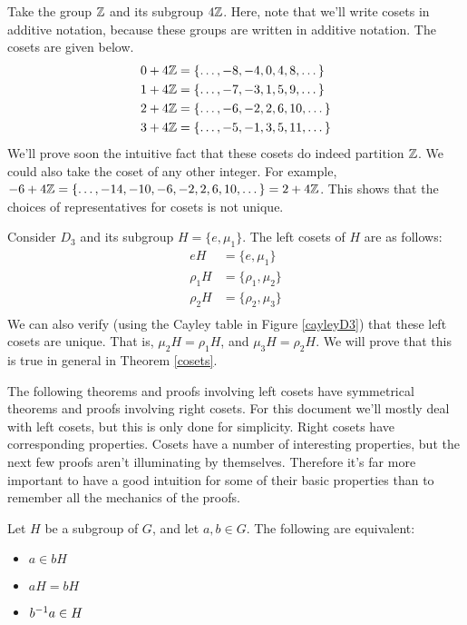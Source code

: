 \begin{example}
Take the group $\mathbb{Z}$ and its subgroup $4\mathbb{Z}$. Here, note that we'll write cosets in additive notation, because these groups are written in additive notation. The cosets are given below.
\begin{align*}
    0 + 4\mathbb{Z} &= \{\dots, -8, -4, 0, 4, 8, \dots\} \\
    1 + 4\mathbb{Z} &= \{\dots, -7, -3, 1, 5, 9, \dots\} \\
    2 + 4\mathbb{Z} &= \{\dots, -6, -2, 2, 6, 10, \dots\} \\
    3 + 4\mathbb{Z} &= \{\dots, -5, -1, 3, 5, 11, \dots\}
\end{align*}
We'll prove soon the intuitive fact that these cosets do indeed partition $\mathbb{Z}$. We could also take the coset of any other integer. For example, $-6 + 4\mathbb{Z} = \{\dots, -14, -10, -6, -2, 2, 6, 10, \dots\} = 2 + 4\mathbb{Z}$. This shows that the choices of representatives for cosets is not unique.
\end{example}

\begin{example}
Consider $D_3$ and its subgroup $H = \{e, \mu_1\}$. The left cosets of $H$ are as follows:
\begin{align*}
    eH      &= \{e, \mu_1\}      \\
    \rho_1H &= \{\rho_1, \mu_2\} \\
    \rho_2H &= \{\rho_2, \mu_3\} \\
\end{align*}
We can also verify (using the Cayley table in Figure \ref{cayleyD3}) that these left cosets are unique. That is, $\mu_2H = \rho_1H$, and $\mu_3H = \rho_2H$. We will prove that this is true in general in Theorem \ref{cosets}.
\end{example}

The following theorems and proofs involving left cosets have symmetrical theorems and proofs involving right cosets. For this document we'll mostly deal with left cosets, but this is only done for simplicity. Right cosets have corresponding properties. Cosets have a number of interesting properties, but the next few proofs  aren't illuminating by themselves. Therefore it's far more important to have a good intuition for some of their basic properties than to remember all the mechanics of the proofs.

\begin{theorem}
\label{cosets}
Let $H$ be a subgroup of $G$, and let $a, b \in G$. The following are equivalent:
\begin{itemize}
\item $a \in bH$
\item $aH = bH$
\item $b^{-1}a \in H$
\end{itemize}
\end{theorem}

